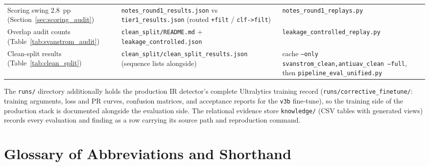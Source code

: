 \begin{table}[htbp]
{\begin{tabular}{p{4.4cm}p{4.6cm}p{4.6cm}}
        Scoring swing $2.8$~pp (Section~\ref{sec:scoring_audit}) & \texttt{notes\_round1\_results.json} vs \texttt{tier1\_results.json} (routed \texttt{+filt} / \texttt{clf->filt}) & \texttt{notes\_round1\_replays.py} \\
        Overlap audit counts (Table~\ref{tab:svanstrom_audit}) & \texttt{clean\_split/README.md} $+$ \texttt{leakage\_controlled.json} & \texttt{leakage\_controlled\_replay.py} \\
        Clean-split results (Table~\ref{tab:clean_split}) & \texttt{clean\_split/\allowbreak clean\_split\_results.json} (sequence lists alongside) & cache \texttt{--only svanstrom\_clean,\allowbreak antiuav\_clean --full}, then \texttt{pipeline\_eval\_unified.py} \\
        \bottomrule
    \end{tabular}}
\end{table}

The \texttt{runs/} directory additionally holds the production IR detector's complete Ultralytics training record (\texttt{runs/corrective\_finetune/}: training arguments, loss and PR curves, confusion matrices, and acceptance reports for the \texttt{v3b} fine-tune), so the training side of the production stack is documented alongside the evaluation side. The relational evidence store \texttt{knowledge/} (CSV tables with generated views) records every evaluation and finding as a row carrying its source path and reproduction command.

\chapter{Glossary of Abbreviations and Shorthand}
\label{app:glossary}

